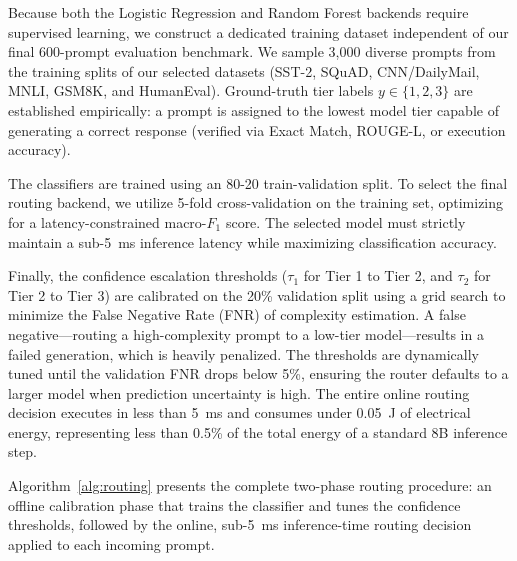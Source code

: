 \documentclass[runningheads]{llncs}
\begin{document}
Because both the Logistic Regression and Random Forest backends require supervised learning, we construct a dedicated training dataset independent of our final 600-prompt evaluation benchmark. We sample 3,000 diverse prompts from the training splits of our selected datasets (SST-2, SQuAD, CNN/DailyMail, MNLI, GSM8K, and HumanEval). Ground-truth tier labels $y \in \{1, 2, 3\}$ are established empirically: a prompt is assigned to the lowest model tier capable of generating a correct response (verified via Exact Match, ROUGE-L, or execution accuracy).

The classifiers are trained using an 80-20 train-validation split. To select the final routing backend, we utilize 5-fold cross-validation on the training set, optimizing for a latency-constrained macro-$F_1$ score. The selected model must strictly maintain a sub-5~ms inference latency while maximizing classification accuracy. 

Finally, the confidence escalation thresholds ($\tau_1$ for Tier 1 to Tier 2, and $\tau_2$ for Tier 2 to Tier 3) are calibrated on the 20\% validation split using a grid search to minimize the False Negative Rate (FNR) of complexity estimation. A false negative—routing a high-complexity prompt to a low-tier model—results in a failed generation, which is heavily penalized. The thresholds are dynamically tuned until the validation FNR drops below 5\%, ensuring the router defaults to a larger model when prediction uncertainty is high. The entire online routing decision executes in less than 5~ms and consumes under 0.05~J of electrical energy, representing less than 0.5\% of the total energy of a standard 8B inference step.

Algorithm~\ref{alg:routing} presents the complete two-phase routing procedure: an offline calibration phase that trains the classifier and tunes the confidence thresholds, followed by the online, sub-5~ms inference-time routing decision applied to each incoming prompt.
\end{document}
